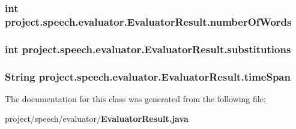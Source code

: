 \subsubsection[{number\+Of\+Words}]{\setlength{\rightskip}{0pt plus 5cm}int project.\+speech.\+evaluator.\+Evaluator\+Result.\+number\+Of\+Words\hspace{0.3cm}{\ttfamily [private]}}\label{classproject_1_1speech_1_1evaluator_1_1_evaluator_result_a71d0c6f10b4d06e6343e7156f3ba1332}
\subsubsection[{substitutions}]{\setlength{\rightskip}{0pt plus 5cm}int project.\+speech.\+evaluator.\+Evaluator\+Result.\+substitutions\hspace{0.3cm}{\ttfamily [private]}}\label{classproject_1_1speech_1_1evaluator_1_1_evaluator_result_a641b78e9746bdb5b5b4f9fb86fb7685e}
\subsubsection[{time\+Span}]{\setlength{\rightskip}{0pt plus 5cm}String project.\+speech.\+evaluator.\+Evaluator\+Result.\+time\+Span\hspace{0.3cm}{\ttfamily [private]}}\label{classproject_1_1speech_1_1evaluator_1_1_evaluator_result_a75610a544860d428cf0b57d0c1a7b15b}


The documentation for this class was generated from the following file\+:\begin{DoxyCompactItemize}
\item 
project/speech/evaluator/{\bf Evaluator\+Result.\+java}\end{DoxyCompactItemize}
